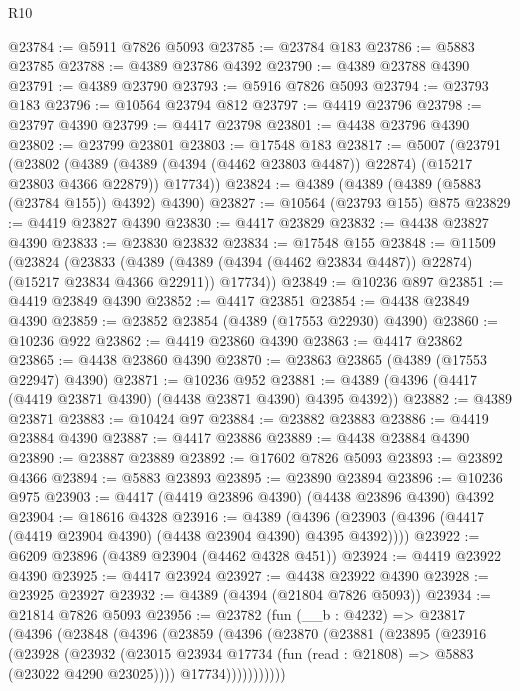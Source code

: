 \begin{lexlean}{R10}
\begin{coremodule}
@23784 := @5911 @7826 @5093
@23785 := @23784 @183
@23786 := @5883 @23785
@23788 := @4389 @23786 @4392
@23790 := @4389 @23788 @4390
@23791 := @4389 @23790
@23793 := @5916 @7826 @5093
@23794 := @23793 @183
@23796 := @10564 @23794 @812
@23797 := @4419 @23796
@23798 := @23797 @4390
@23799 := @4417 @23798
@23801 := @4438 @23796 @4390
@23802 := @23799 @23801
@23803 := @17548 @183
@23817 := @5007
    (@23791
      (@23802
        (@4389 (@4389 (@4394 (@4462 @23803 @4487)) @22874) (@15217 @23803 @4366 @22879))
        @17734))
@23824 := @4389 (@4389 (@4389 (@5883 (@23784 @155)) @4392) @4390)
@23827 := @10564 (@23793 @155) @875
@23829 := @4419 @23827 @4390
@23830 := @4417 @23829
@23832 := @4438 @23827 @4390
@23833 := @23830 @23832
@23834 := @17548 @155
@23848 := @11509
    (@23824
      (@23833
        (@4389 (@4389 (@4394 (@4462 @23834 @4487)) @22874) (@15217 @23834 @4366 @22911))
        @17734))
@23849 := @10236 @897
@23851 := @4419 @23849 @4390
@23852 := @4417 @23851
@23854 := @4438 @23849 @4390
@23859 := @23852 @23854 (@4389 (@17553 @22930) @4390)
@23860 := @10236 @922
@23862 := @4419 @23860 @4390
@23863 := @4417 @23862
@23865 := @4438 @23860 @4390
@23870 := @23863 @23865 (@4389 (@17553 @22947) @4390)
@23871 := @10236 @952
@23881 := @4389 (@4396 (@4417 (@4419 @23871 @4390) (@4438 @23871 @4390) @4395 @4392))
@23882 := @4389 @23871
@23883 := @10424 @97
@23884 := @23882 @23883
@23886 := @4419 @23884 @4390
@23887 := @4417 @23886
@23889 := @4438 @23884 @4390
@23890 := @23887 @23889
@23892 := @17602 @7826 @5093
@23893 := @23892 @4366
@23894 := @5883 @23893
@23895 := @23890 @23894
@23896 := @10236 @975
@23903 := @4417 (@4419 @23896 @4390) (@4438 @23896 @4390) @4392
@23904 := @18616 @4328
@23916 := @4389
    (@4396 (@23903 (@4396 (@4417 (@4419 @23904 @4390) (@4438 @23904 @4390) @4395 @4392))))
@23922 := @6209 @23896 (@4389 @23904 (@4462 @4328 @451))
@23924 := @4419 @23922 @4390
@23925 := @4417 @23924
@23927 := @4438 @23922 @4390
@23928 := @23925 @23927
@23932 := @4389 (@4394 (@21804 @7826 @5093))
@23934 := @21814 @7826 @5093
@23956 := @23782
    (fun (__b : @4232) =>
    @23817
      (@4396
        (@23848
          (@4396
            (@23859
              (@4396
                (@23870
                  (@23881
                    (@23895
                      (@23916
                        (@23928
                          (@23932
                            (@23015
                              @23934
                              @17734
                              (fun (read : @21808) => @5883 (@23022 @4290 @23025))))
                          @17734)))))))))))

\end{coremodule}
\end{lexlean}
